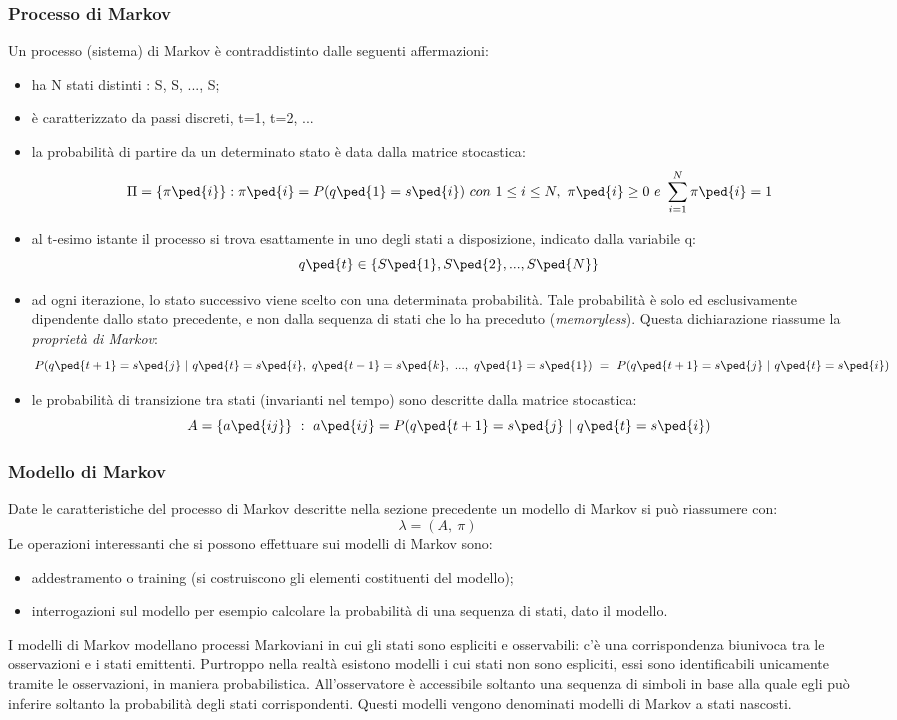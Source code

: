 \subsubsection*{Processo di Markov}
\label{3.3.2.1}
Un processo (sistema) di Markov è contraddistinto dalle seguenti affermazioni:
\begin{itemize}
\item ha N stati distinti : S, S, ..., S;
\item è caratterizzato da passi discreti, t=1, t=2, ...
\item la probabilità di partire da un determinato stato è data dalla \gls{matrice stocastica}: 
\[ \Pi =\{\pi\ped{i}\}: \pi\ped{i}=P(q\ped{1} = s\ped{i})\ con\ 1\le i\le N,\  \pi\ped{i}\ge 0\  e\  \sum\limits_{i=1}^N \pi\ped{i} = 1 \]
\item al t-esimo istante il processo si trova esattamente in uno degli stati a disposizione, indicato dalla variabile q:
\[ q\ped{t} \in \{S\ped{1}, S\ped{2}, ..., S\ped{N}\}\]
\item ad ogni iterazione, lo stato successivo viene scelto con una determinata probabilità. Tale probabilità è solo ed esclusivamente dipendente dallo stato precedente, e non dalla sequenza di stati che lo ha preceduto (\emph{memoryless}). Questa dichiarazione riassume la \emph{proprietà di Markov}:
\[ P(q\ped{t+1}=s\ped{j}\ |\ q\ped{t}=s\ped{i},\ q\ped{t-1}=s\ped{k},\ ...,\ q\ped{1}=s\ped{1})\ =\ P(q\ped{t+1}=s\ped{j}\ |\ q\ped{t}=s\ped{i})\]
\item le probabilità di transizione tra stati (invarianti nel tempo) sono descritte dalla matrice stocastica:
\[ A=\{a\ped{ij}\}\ :\ a\ped{ij}=P(q\ped{t+1}=s\ped{j}\ |\ q\ped{t}=s\ped{i})\]
\end{itemize}
\subsubsection*{Modello di Markov}
\label{3.3.2.2}
Date le caratteristiche del processo di Markov descritte nella sezione precedente un modello di Markov si può riassumere con:
\[\lambda=(A,\ \pi)\]
Le operazioni interessanti che si possono effettuare sui modelli di Markov sono:
\begin{itemize}
\item addestramento o training (si costruiscono gli elementi costituenti del modello);
\item interrogazioni sul modello per esempio calcolare la probabilità di una sequenza di stati, dato il modello.
\end{itemize}
I modelli di Markov modellano processi Markoviani in cui gli stati sono espliciti e osservabili: c'è una corrispondenza biunivoca tra le osservazioni e i stati emittenti. Purtroppo nella realtà esistono modelli i cui stati non sono espliciti, essi sono identificabili unicamente tramite le osservazioni, in maniera probabilistica. All'osservatore è accessibile soltanto una sequenza di simboli in base alla quale egli può inferire soltanto la probabilità degli stati corrispondenti. Questi modelli vengono denominati modelli di Markov a stati nascosti.
